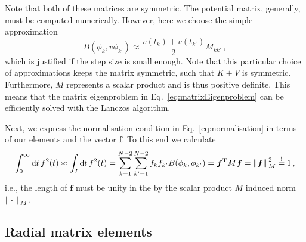 \documentclass[fontsize=12pt,
               twoside=false,
               BCOR=0mm,
               DIV=14,
               overfullrule=true, %
               toc=bibliography,
               headinclude=true,
               footinclude=false]{scrartcl}
\numberwithin{equation}{section}
\begin{document}
    Note that both of these matrices are symmetric. The potential matrix,
    generally, must be computed numerically. However, here we choose the simple
    approximation
    \begin{equation}
        B(\phi_k,v\phi_{k'})
        \approx
        \frac{v(t_k)+v(t_{k'})}{2}
        M_{k{k'}}
    \,,
    \end{equation}
    which is justified if the step size is small enough. Note that this
    particular choice of approximations keeps the matrix symmetric, such that
    $K+V$ is symmetric. Furthermore, $M$ represents a scalar product and is thus
    positive definite. This means that the matrix eigenproblem in
    Eq.~\eqref{eq:matrixEigenproblem} can be efficiently solved with the Lanczos
    algorithm.

    Next, we express the normalisation condition in
    Eq.~\eqref{eq:normalisation} in terms of our elements and the vector
    $\bm{f}$. To this end we calculate
    \begin{equation}
        \int^\infty_0\dd{t}f^2(t)
        \approx
        \int_I  \dd{t} f^2(t)
        =
        \sum^{N-2}_{k=1}\sum^{N-2}_{k'=1}f_kf_{k'} B(\phi_k,\phi_{k'})
        =
        \bm{f}^\mathrm{T}M\bm{f}
        =
        \norm*{\bm{f}}^2_M
        \overset{!}{=}
        1
    \,,
    \end{equation}
    i.e., the length of $\bm{f}$ must be unity in the by the scalar product $M$
    induced norm $\norm*{\,\cdot\,}_M$.

    \subsection{Radial matrix elements}
    \label{subsec:RadialMatrixElements}
\end{document}
